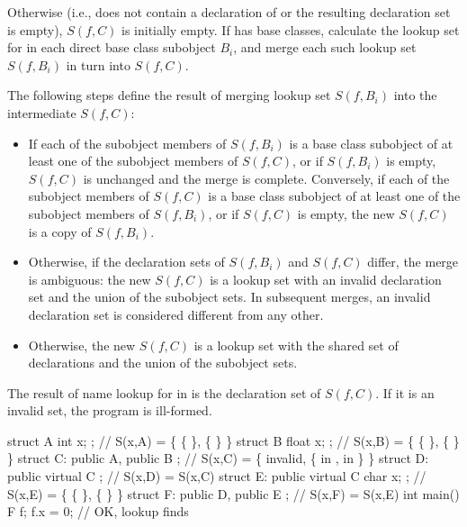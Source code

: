 \pnum
Otherwise (i.e.,  does not contain a declaration of 
or the resulting declaration set is empty), $S(f,C)$ is initially empty.
If  has base classes, calculate the lookup set for  in
each direct base class subobject $B_i$, and merge each such lookup set
$S(f,B_i)$ in turn into $S(f,C)$.

\pnum
The following steps define the result of merging lookup set $S(f,B_i)$
into the intermediate $S(f,C)$:

\begin{itemize}
\item If each of the subobject members of $S(f,B_i)$ is a base class
subobject of at least one of the subobject members of $S(f,C)$, or if
$S(f,B_i)$ is empty, $S(f,C)$ is unchanged and the merge is complete.
Conversely, if each of the subobject members of $S(f,C)$ is a base class
subobject of at least one of the subobject members of $S(f,B_i)$, or if
$S(f,C)$ is empty, the new $S(f,C)$ is a copy of $S(f,B_i)$.

\item Otherwise, if the declaration sets of $S(f,B_i)$ and $S(f,C)$
differ, the merge is ambiguous: the new $S(f,C)$ is a lookup set with an
invalid declaration set and the union of the subobject sets. In
subsequent merges, an invalid declaration set is considered different
from any other.

\item Otherwise, the new $S(f,C)$ is a lookup set with the shared set of
declarations and the union of the subobject sets.
\end{itemize}

\pnum
The result of name lookup for  in  is the declaration
set of $S(f,C)$. If it is an invalid set, the program is ill-formed.
\enterexample
\begin{codeblock}
struct A { int x; };                    // S(x,A) = \{ \{  \}, \{  \} \}
struct B { float x; };                  // S(x,B) = \{ \{  \}, \{  \} \}
struct C: public A, public B { };       // S(x,C) = \{ invalid, \{  in ,  in  \} \}
struct D: public virtual C { };         // S(x,D) = S(x,C)
struct E: public virtual C { char x; }; // S(x,E) = \{ \{  \}, \{  \} \}
struct F: public D, public E { };       // S(x,F) = S(x,E)
int main() {
  F f;
  f.x = 0;                              // OK, lookup finds 
}
\end{codeblock}

